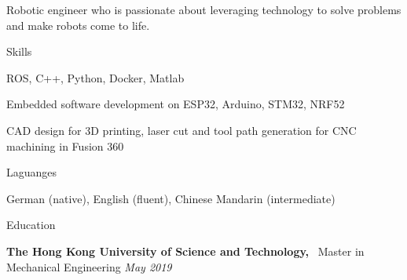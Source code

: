 \documentclass[
	a4paper, %
	11pt, %
]{resume} %
\begin{document}
Robotic engineer who is passionate about leveraging technology to solve problems and make robots come to life.


\begin{rSection}{Skills}

	\item ROS, C++, Python, Docker, Matlab
	\item Embedded software development on ESP32, Arduino, STM32, NRF52
	\item CAD design for 3D printing, laser cut and tool path generation for CNC machining in Fusion 360

\end{rSection}



\begin{rSection}{Laguanges}
	\item German (native), English (fluent), Chinese Mandarin (intermediate)

\end{rSection}



\begin{rSection}{Education}
	
	\textbf{The Hong Kong University of Science and Technology,} \ Master in Mechanical Engineering \hfill \textit{May 2019}

	
\end{rSection}

\end{document}
